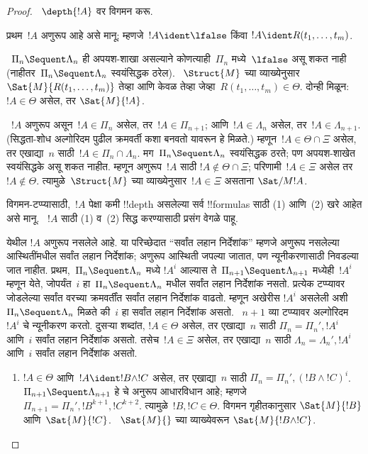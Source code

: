 \documentclass[../../../include/open-logic-section]{subfiles}
\begin{document}
\begin{proof}
~$\depth{!A}$ वर विगमन करू.

प्रथम~$!A$ अणुरूप आहे असे मानू;
म्हणजे~$!A \ident \lfalse$ किंवा
$!A \ident R(t_1, \dots, t_m)$.

~$\Pi_n \Sequent \Lambda_n$ ही अपयश-शाखा
असल्याने कोणत्याही~$\Pi_n$ मध्ये~$\lfalse$
असू शकत नाही (नाहीतर~$\Pi_n \Sequent \Lambda_n$
स्वयंसिद्धक ठरेल). ~$\Struct{M}$ च्या व्याख्येनुसार
$\Sat{M}{R(t_1, \dots, t_m)}$ तेव्हा आणि केवळ तेव्हा
जेव्हा~$R(t_1, \dots, t_m) \in \Theta$.
दोन्ही मिळून: $!A \in \Theta$ असेल, तर
$\Sat{M}{!A}$.

~$!A$ अणुरूप असून~$!A \in \Pi_n$ असेल,
तर~$!A \in \Pi_{n+1}$; आणि~$!A \in \Lambda_n$
असेल, तर~$!A \in \Lambda_{n+1}$.
(सिद्धता-शोध अल्गोरिदम पुढील क्रमवर्ती कशा
बनवतो यावरून हे मिळते.) म्हणून~$!A \in \Theta \cap \Xi$
असेल, तर एखाद्या~$n$ साठी~$!A \in \Pi_n \cap
\Lambda_n$. मग~$\Pi_n \Sequent \Lambda_n$
स्वयंसिद्धक ठरते; पण अपयश-शाखेत स्वयंसिद्धके
असू शकत नाहीत. म्हणून अणुरूप~$!A$ साठी
$!A \notin \Theta \cap \Xi$; परिणामी~$!A \in \Xi$
असेल तर~$!A \notin \Theta$. त्यामुळे~$\Struct{M}$
च्या व्याख्येनुसार~$!A \in \Xi$ असताना
$\Sat/{M}{!A}$.

विगमन-टप्प्यासाठी,~$!A$ पेक्षा कमी
!!{depth} असलेल्या सर्व !!{formula}s साठी
(1) आणि~(2) खरे आहेत असे मानू. ~$!A$ साठी
(1) व~(2) सिद्ध करण्यासाठी प्रसंग वेगळे पाहू.

येथील $!A$ अणुरूप नसलेले आहे. या परिच्छेदात
“सर्वांत लहान निर्देशांक” म्हणजे अणुरूप नसलेल्या
आस्थितींमधील सर्वांत लहान निर्देशांक; अणुरूप आस्थिती
जपल्या जातात, पण न्यूनीकरणासाठी निवडल्या जात नाहीत.
प्रथम,~$\Pi_n \Sequent \Lambda_n$ मध्ये
$!A^i$ आल्यास ते~$\Pi_{n+1} \Sequent \Lambda_{n+1}$
मध्येही~$!A^i$ म्हणून येते, जोपर्यंत~$i$ हा~$\Pi_n \Sequent \Lambda_n$
मधील सर्वांत लहान निर्देशांक नसतो. प्रत्येक
टप्प्यावर जोडलेल्या सर्वांत वरच्या क्रमवर्तींत
सर्वांत लहान निर्देशांक वाढतो. म्हणून अखेरीस
$!A^i$ असलेली अशी~$\Pi_n \Sequent \Lambda_n$
मिळते की~$i$ हा सर्वांत लहान निर्देशांक असतो.
~$n+1$ व्या टप्प्यावर अल्गोरिदम~$!A^i$ चे
न्यूनीकरण करतो. दुसऱ्या शब्दांत,
$!A \in \Theta$ असेल, तर एखाद्या~$n$ साठी
$\Pi_n = \Pi_n', !A^i$ आणि~$i$ सर्वांत
लहान निर्देशांक असतो. तसेच~$!A \in \Xi$
असेल, तर एखाद्या~$n$ साठी
$\Lambda_n = \Lambda_n', !A^i$ आणि~$i$
सर्वांत लहान निर्देशांक असतो.

\begin{enumerate}
  \item $!A \in \Theta$ आणि~$!A \ident !B \land !C$
  असेल, तर एखाद्या~$n$ साठी
  $\Pi_n = \Pi_n', (!B \land !C)^i$.
  ~$\Pi_{n+1} \Sequent \Lambda_{n+1}$ हे
  \LeftR{\land} चे अनुरूप आधारविधान आहे;
  म्हणजे~$\Pi_{n+1} = \Pi_n', !B^{k+1}, !C^{k+2}$.
  त्यामुळे~$!B, !C \in \Theta$. विगमन गृहीतकानुसार
  $\Sat{M}{!B}$ आणि~$\Sat{M}{!C}$.
  ~$\Sat{M}{}$ च्या व्याख्येवरून
  $\Sat{M}{!B \land !C}$.


\end{enumerate}
\end{proof}
\end{document}
